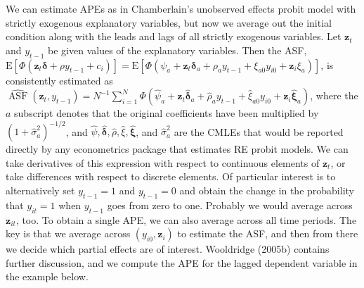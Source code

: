 \documentclass[10pt]{article}
\begin{document}
We can estimate APEs as in Chamberlain's unobserved effects probit model with strictly exogenous explanatory variables, but now we average out the initial condition along with the leads and lags of all strictly exogenous variables. Let $\mathbf{z}_{t}$ and $y_{t-1}$ be given values of the explanatory variables. Then the ASF, $\mathrm{E}\left[\Phi\left(\mathbf{z}_{t} \boldsymbol{\delta}+\rho y_{t-1}+c_{i}\right)\right]= \mathrm{E}\left[\Phi\left(\psi_{a}+\mathbf{z}_{t} \boldsymbol{\delta}_{a}+\rho_{a} y_{t-1}+\xi_{a 0} y_{i 0}+\mathbf{z}_{i} \xi_{a}\right)\right]$, is consistently estimated as $\widehat{\operatorname{ASF}}\left(\mathbf{z}_{t}, y_{t-1}\right)= N^{-1} \sum_{i=1}^{N} \Phi\left(\hat{\psi}_{a}+\mathbf{z}_{t} \hat{\boldsymbol{\delta}}_{a}+\hat{\rho}_{a} y_{t-1}+\hat{\xi}_{a 0} y_{i 0}+\mathbf{z}_{i} \hat{\boldsymbol{\xi}}_{a}\right)$, where the $a$ subscript denotes that the original coefficients have been multiplied by $\left(1+\hat{\sigma}_{a}^{2}\right)^{-1 / 2}$, and $\hat{\psi}, \hat{\boldsymbol{\delta}}, \hat{\rho}, \hat{\xi}, \hat{\boldsymbol{\xi}}$, and $\hat{\sigma}_{a}^{2}$ are the CMLEs that would be reported directly by any econometrics package that estimates RE probit models. We can take derivatives of this expression with respect to continuous elements of $\mathbf{z}_{t}$, or take differences with respect to discrete elements. Of particular interest is to alternatively set $y_{t-1}=1$ and $y_{t-1}=0$ and obtain the change in the probability that $y_{i t}=1$ when $y_{t-1}$ goes from zero to one. Probably we would average across $\mathbf{z}_{i t}$, too. To obtain a single APE, we can also average across all time periods. The key is that we average across $\left(y_{i 0}, \mathbf{z}_{i}\right)$ to estimate the ASF, and then from there we decide which partial effects are of interest. Wooldridge (2005b) contains further discussion, and we compute the APE for the lagged dependent variable in the example below.
\end{document}
